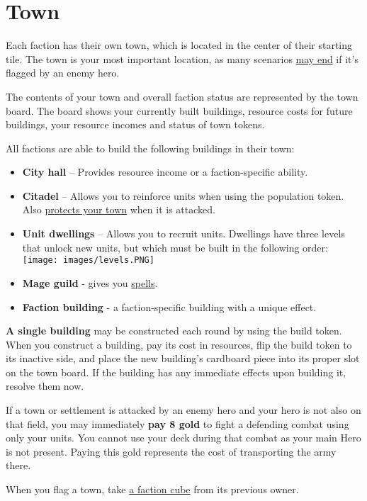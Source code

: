 \documentclass[12pt]{article}
\begin{document}
\section[Town]{Town\hypertarget{Town}{}}
Each faction has their own town, which is located in the center of their starting tile. The town is your most important location, as many scenarios \hyperlink{End}{may end} if it's flagged by an enemy hero.\par
The contents of your town and overall faction status are represented by the town board. The board shows your currently built buildings, resource costs for future buildings, your resource incomes and status of town tokens.\par
All factions are able to build the following buildings in their town:
\begin{itemize}
    \item \textbf{City hall} – Provides resource income or a faction-specific ability.
    \item \textbf{Citadel} – Allows you to reinforce units when using the population token. Also \hyperlink{Walls}{protects your town} when it is attacked.
    \item \textbf{Unit dwellings} – Allows you to recruit units. Dwellings have three levels that unlock new units, but which must be built in the following order:\texttt{[image: images/levels.PNG]}
    \item \textbf{Mage guild} - gives you \hyperlink{spells}{spells}.
    \item \textbf{Faction building} - a faction-specific building with a unique effect.
\end{itemize}
\textbf{A single building} may be constructed each round by using the build token. When you construct a building, pay its cost in resources, flip the build token to its inactive side, and place the new building’s cardboard piece into its proper slot on the town board. If the building has any immediate effects upon building it, resolve them now.\par
If a town or settlement is attacked by an enemy hero and your hero is not also on that field, you may immediately \textbf{pay 8 gold} to fight a defending combat using only your units. You cannot use your deck during that combat as your main Hero is not present. Paying this gold represents the cost of transporting the army there.\par
When you flag a town, take \hyperlink{End}{a faction cube} from its previous owner.
\end{document}
